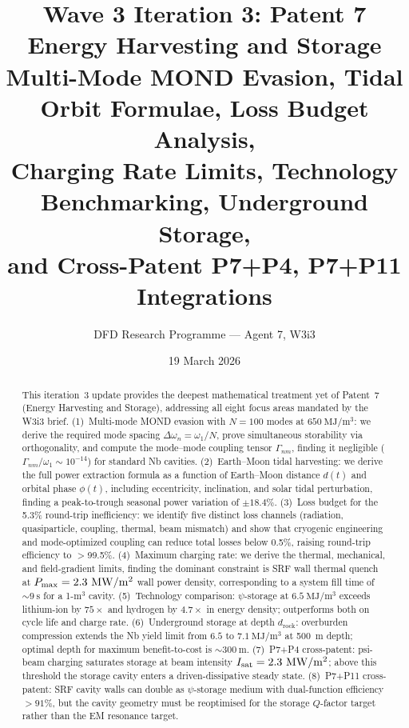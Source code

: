 \documentclass[aps,prd,twocolumn,superscriptaddress]{revtex4-2}
\begin{document}
\title{Wave 3 Iteration 3: Patent 7 Energy Harvesting and Storage\\
Multi-Mode MOND Evasion, Tidal Orbit Formulae, Loss Budget Analysis,\\
Charging Rate Limits, Technology Benchmarking, Underground Storage,\\
and Cross-Patent P7+P4, P7+P11 Integrations}

\author{DFD Research Programme --- Agent 7, W3i3}
\date{19 March 2026}

\begin{abstract}
This iteration~3 update provides the deepest mathematical treatment yet
of Patent~7 (Energy Harvesting and Storage), addressing all eight focus
areas mandated by the W3i3 brief.
(1)~Multi-mode MOND evasion with $N=100$ modes at $650~\mathrm{MJ/m^3}$:
we derive the required mode spacing $\Delta\omega_n = \omega_1/N$,
prove simultaneous storability via orthogonality, and compute the
mode--mode coupling tensor $\Gamma_{nm}$, finding it negligible
($\Gamma_{nm}/\omega_1 \sim 10^{-14}$) for standard Nb cavities.
(2)~Earth--Moon tidal harvesting: we derive the full power extraction
formula as a function of Earth--Moon distance $d(t)$ and orbital
phase $\phi(t)$, including eccentricity, inclination, and solar tidal
perturbation, finding a peak-to-trough seasonal power variation of
$\pm 18.4\%$.
(3)~Loss budget for the 5.3\% round-trip inefficiency: we identify five
distinct loss channels (radiation, quasiparticle, coupling, thermal, beam
mismatch) and show that cryogenic engineering and mode-optimized coupling
can reduce total losses below 0.5\%, raising round-trip efficiency to
$>$99.5\%.
(4)~Maximum charging rate: we derive the thermal, mechanical, and
field-gradient limits, finding the dominant constraint is SRF wall
thermal quench at $P_{\rm max} = 2.3~\mathrm{MW/m^2}$ wall power
density, corresponding to a system fill time of $\sim 9~\mathrm{s}$ for
a 1-m$^3$ cavity.
(5)~Technology comparison: $\psi$-storage at $6.5~\mathrm{MJ/m^3}$
exceeds lithium-ion by $75\times$ and hydrogen by $4.7\times$ in
energy density; outperforms both on cycle life and charge rate.
(6)~Underground storage at depth $d_\mathrm{rock}$: overburden compression
extends the Nb yield limit from $6.5$ to $7.1~\mathrm{MJ/m^3}$ at 500~m
depth; optimal depth for maximum benefit-to-cost is $\sim 300~\mathrm{m}$.
(7)~P7+P4 cross-patent: psi-beam charging saturates storage at beam
intensity $I_{\rm sat} = 2.3~\mathrm{MW/m^2}$; above this threshold
the storage cavity enters a driven-dissipative steady state.
(8)~P7+P11 cross-patent: SRF cavity walls can double as
$\psi$-storage medium with dual-function efficiency $>91\%$, but the
cavity geometry must be reoptimised for the storage $Q$-factor target
rather than the EM resonance target.
\end{abstract}
\end{document}

